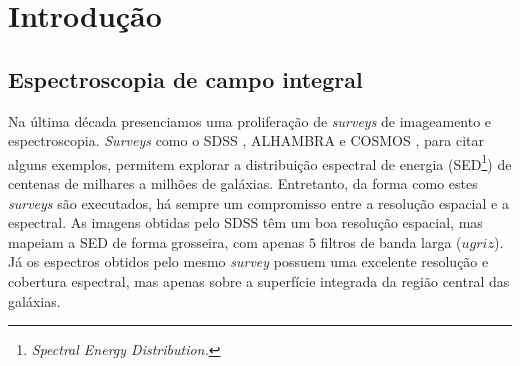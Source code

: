 


\chapter{Introdução}
\label{sec:intro}


\section{Espectroscopia de campo integral}

Na última década presenciamos uma proliferação de {\em surveys} de imageamento e
espectroscopia. {\em Surveys} como o SDSS \citep{York2000}, ALHAMBRA
\citep{Moles2008} e COSMOS \citep{Scoville2007}, para citar alguns exemplos,
permitem explorar a distribuição espectral de energia (SED\footnote{\em Spectral
Energy Distribution.}) de centenas de milhares a milhões de galáxias.
Entretanto, da forma como estes {\em surveys} são executados, há sempre um
compromisso entre a resolução espacial e a espectral. As imagens obtidas pelo
SDSS têm um boa resolução espacial, mas mapeiam a SED de forma grosseira, com
apenas $5$ filtros de banda larga ($ugriz$). Já os espectros obtidos pelo mesmo
{\em survey} possuem uma excelente resolução e cobertura espectral, mas apenas
sobre a superfície integrada da região central das galáxias.

